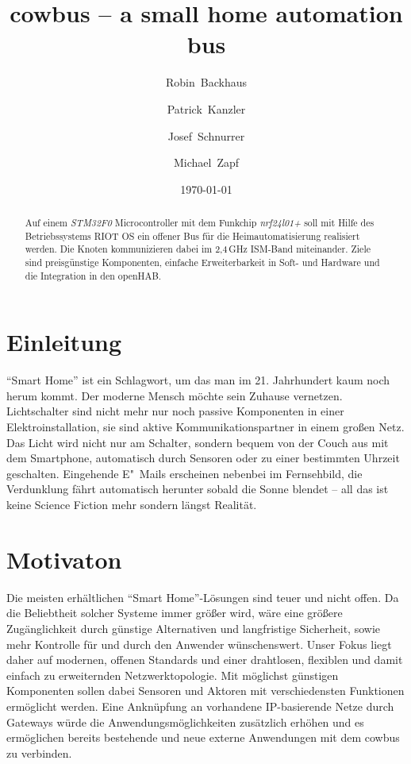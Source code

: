 \documentclass{IEEEtran}
\begin{document}
\title{cowbus -- a small home automation bus}
\author{Robin~Backhaus \and Patrick~Kanzler \and Josef~Schnurrer \and Michael~Zapf}
\date{\today}



\maketitle

\begin{abstract}
Auf einem \emph{STM32F0} Microcontroller mit dem Funkchip \emph{nrf24l01+} soll mit Hilfe des Betriebssystems RIOT OS ein offener Bus für die Heimautomatisierung realisiert werden. Die Knoten kommunizieren dabei im 2,4\,GHz ISM-Band miteinander. Ziele sind preisgünstige Komponenten, einfache Erweiterbarkeit in Soft- und Hardware und die Integration in den \ac{openHAB}.
\end{abstract}

\section{Einleitung}
    \enquote{Smart Home} ist ein Schlagwort, um das man im 21. Jahrhundert
    kaum noch herum kommt. Der moderne Mensch möchte sein Zuhause vernetzen.
    Lichtschalter sind nicht mehr nur noch passive Komponenten in einer
    Elektroinstallation, sie sind aktive Kommunikationspartner in einem großen Netz.
    Das Licht wird nicht nur am Schalter, sondern bequem von der Couch aus mit dem
    Smartphone, automatisch durch Sensoren oder zu einer bestimmten Uhrzeit geschalten. 
    Eingehende E"~Mails erscheinen nebenbei im Fernsehbild, die Verdunklung fährt 
    automatisch herunter sobald die Sonne blendet --
    all das ist keine Science Fiction mehr sondern längst Realität.

\section{Motivaton}
    Die meisten erhältlichen \enquote{Smart Home}-Lösungen sind teuer und nicht offen.
    Da die Beliebtheit solcher Systeme immer größer wird, wäre eine größere 
    Zugänglichkeit durch günstige Alternativen und langfristige Sicherheit, 
    sowie mehr Kontrolle für und durch den Anwender wünschenswert.
    Unser Fokus liegt daher auf modernen, offenen Standards und einer drahtlosen, 
    flexiblen und damit einfach zu erweiternden Netzwerktopologie.
    Mit möglichst günstigen Komponenten sollen dabei Sensoren und Aktoren 
    mit verschiedensten Funktionen ermöglicht werden.
    Eine Anknüpfung an vorhandene IP-basierende Netze durch Gateways würde die 
    Anwendungsmöglichkeiten zusätzlich erhöhen 
    und es ermöglichen bereits bestehende und neue externe Anwendungen mit dem 
    cowbus zu verbinden.
\end{document}
